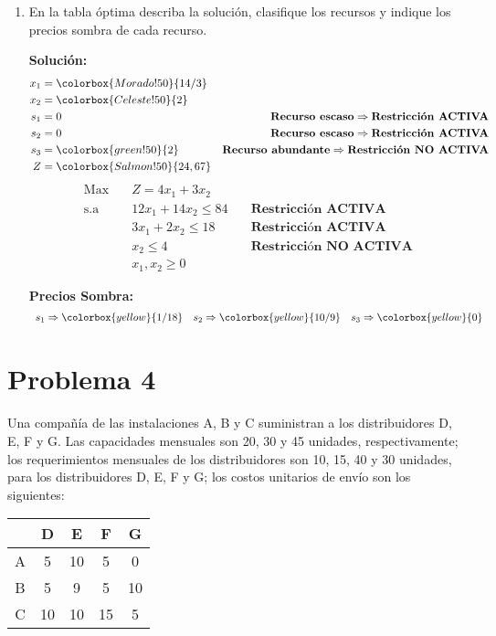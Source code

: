 \documentclass{templateNote}
\begin{document}
\begin{enumerate}
    \item En la tabla \'optima describa la soluci\'on, clasifique los recursos y indique los precios sombra de cada recurso.
    
    \textbf{Solución:}
    \begin{align*}
        x_1 &= \colorbox{Morado!50}{14/3} \\
        x_2 &= \colorbox{Celeste!50}{2} \\
        s_1 &= 0 \qquad &\textbf{Recurso escaso} \Rightarrow \textbf{Restricci\'on ACTIVA} \\
        s_2 &= 0 \qquad &\textbf{Recurso escaso} \Rightarrow \textbf{Restricci\'on ACTIVA} \\
        s_3 &= \colorbox{green!50}{2} \qquad &\textbf{Recurso abundante} \Rightarrow \textbf{Restricci\'on NO ACTIVA} \\
        Z &= \colorbox{Salmon!50}{24,67}
    \end{align*}
    \begin{equation*}
        \begin{aligned}
            \text{Max} \quad & Z = 4x_1 + 3x_2 \\
            \text{s.a} \quad & 12x_1 + 14x_2 \leq 84 \quad &\textbf{Restricci\'on ACTIVA} \\
            & 3x_1 + 2x_2 \leq 18 \quad &\textbf{Restricci\'on ACTIVA} \\
            & x_2 \leq 4 \quad &\textbf{Restricci\'on NO ACTIVA} \\
            & x_1, x_2 \geq 0
        \end{aligned}
    \end{equation*}

    \textbf{Precios Sombra:}
    \begin{align*}
        \begin{array}{ccc}
            s_1 \Rightarrow \colorbox{yellow}{1/18} & s_2 \Rightarrow \colorbox{yellow}{10/9} & s_3 \Rightarrow \colorbox{yellow}{0}
        \end{array}
    \end{align*}
\end{enumerate}

\newpage
\section*{Problema 4}
Una compa\~n\'ia de las instalaciones A, B y C suministran a los distribuidores D, E, F y G.
Las capacidades mensuales son 20, 30 y 45 unidades, respectivamente; los requerimientos mensuales de los distribuidores son 10, 15, 40 y 30 unidades, para los distribuidores D, E, F y G; los costos unitarios de env\'io son los siguientes:
\begin{center}
    \begin{tabular}{|c|cccc|}
        \hline
        & D & E & F & G \\ \hline
        A & 5 & 10 & 5 & 0 \\
        B & 5 & 9 & 5 & 10 \\
        C & 10 & 10 & 15 & 5 \\ \hline
    \end{tabular}
\end{center}
\end{document}
